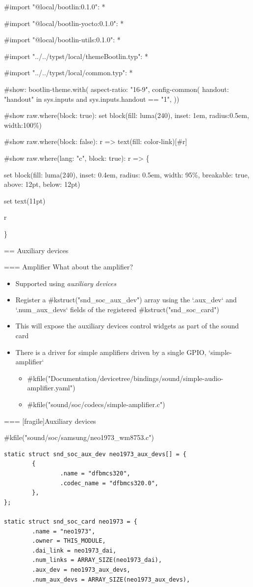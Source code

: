 #import "@local/bootlin:0.1.0": * 

#import "@local/bootlin-yocto:0.1.0": *

#import "@local/bootlin-utils:0.1.0": *

#import "../../typst/local/themeBootlin.typ": *

#import "../../typst/local/common.typ": *

#show: bootlin-theme.with(
  aspect-ratio: "16-9",
config-common(
  handout: "handout" in sys.inputs and sys.inputs.handout == "1",
))

#show raw.where(block: true): set block(fill: luma(240), inset: 1em, radius:0.5em, width:100\%) 

#show raw.where(block: false): r => { text(fill: color-link)[#r] } 

#show raw.where(lang: "c", block: true): r => \{

set block(fill: luma(240),
inset: 0.4em,
radius: 0.5em,
width: 95\%, breakable: true, above: 12pt, below: 12pt)

set text(11pt)

r

\} 

== Auxiliary devices

=== {Amplifier}
  What about the amplifier?
  \begin{itemize}
  \item Supported using {\em auxiliary devices}
  \item Register a #kstruct("snd_soc_aux_dev") array using the
    `.aux_dev` and `.num_aux_devs` fields of the registered
    #kstruct("snd_soc_card")
  \item This will expose the auxiliary devices control widgets as part
    of the sound card
  \item There is a driver for simple amplifiers driven by a single
    GPIO, `simple-amplifier`
    \begin{itemize}
      \item #kfile("Documentation/devicetree/bindings/sound/simple-audio-amplifier.yaml")
      \item #kfile("sound/soc/codecs/simple-amplifier.c")
    \end{itemize}
  \end{itemize}


=== [fragile]{Auxiliary devices}
  \begin{block}{#kfile("sound/soc/samsung/neo1973_wm8753.c")}
    \fontsize{9}{9}\selectfont
    \begin{verbatim}
static struct snd_soc_aux_dev neo1973_aux_devs[] = {
        {
                .name = "dfbmcs320",
                .codec_name = "dfbmcs320.0",
        },
};

static struct snd_soc_card neo1973 = {
        .name = "neo1973",
        .owner = THIS_MODULE,
        .dai_link = neo1973_dai,
        .num_links = ARRAY_SIZE(neo1973_dai),
        .aux_dev = neo1973_aux_devs,
        .num_aux_devs = ARRAY_SIZE(neo1973_aux_devs),
    \end{verbatim}
  \end{block}


